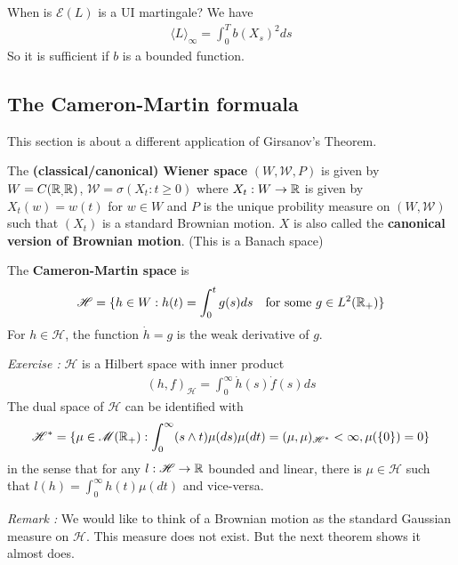 \documentclass[10pt,a4paper]{article}
\begin{document}
\quad When is $\mathscr{E}(L)$ is a UI martingale? We have
\begin{align*}
\langle L \rangle_{\infty} = \int_0^T b(X_s)^2 ds
\end{align*}
So it is sufficient if $b$ is a bounded function.

\subsection{The Cameron-Martin formuala}

This section is about a different application of Girsanov's Theorem.
\s

 The \textbf{(classical/canonical) Wiener space} $(W,\mathscr{W}, P)$ is given by $W = C(\mathbb{R}_, \mathbb{R})$, $\mathscr{W} = \sigma(X_t : t\geq 0)$ where $X_t : W\rightarrow \mathbb{R}$ is given by $X_t(w) = w(t)$ for $w\in W$ and $P$ is the unique probility measure on $(W, \mathscr{W})$ such that $(X_t)$ is a standard Brownian motion. $X$ is also called the \textbf{canonical version of Brownian motion}. (This is a Banach space)
\s

 The \textbf{Cameron-Martin space} is
\begin{align*}
\mathscr{H} = \{h \in W : h(t) = \int_0^t g(s) ds \quad \text{for some }g\in L^2(\mathbb{R}_+) \}
\end{align*}
For $h\in \mathscr{H}$, the function $\dot{h} =g$ is the weak derivative of $g$.
\s

\emph{Exercise :} $\mathscr{H}$ is a Hilbert space with inner product
\begin{align*}
(h, f)_{\mathscr{H}} = \int_0^{\infty} \dot{h}(s)\dot{f}(s) ds
\end{align*} 
The dual space of $\mathscr{H}$ can be identified with
\begin{align*}
\mathscr{H}^* = \{\mu \in \mathscr{M}(\mathbb{R}_+) : \int_0^{\infty }(s\wedge t)\mu(ds) \mu(dt) = (\mu, \mu)_{\mathscr{H}^*}< \infty, \mu(\{0\})=0\}
\end{align*}
in the sense that for any $l: \mathscr{H} \rightarrow \mathbb{R}$ bounded and linear, there is $\mu \in \mathscr{H}$ such that $l(h) = \int_0^{\infty} h(t) \mu(dt)$ and vice-versa.
\s

\emph{Remark :} We would like to think of a Brownian motion as the standard Gaussian measure on $\mathscr{H}$. This measure does not exist. But the next theorem shows it almost does.
\s
\end{document}
